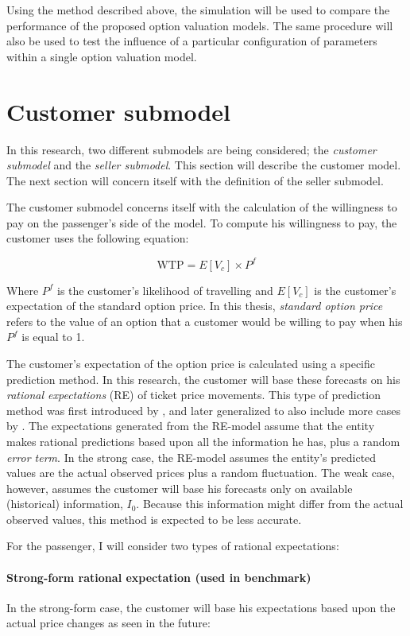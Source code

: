 Using the method described above, the simulation will be used to compare the performance of the proposed option valuation models. The same procedure will also be used to test the influence of a particular configuration of parameters within a single option valuation model.


\section{Customer submodel}
\label{sec:CustomerSubmodel}
In this research, two different submodels are being considered; the \emph{customer submodel} and the \emph{seller submodel}. This section will describe the customer model. The next section will concern itself with the definition of the seller submodel.

The customer submodel concerns itself with the calculation of the willingness to pay on the passenger's side of the model. To compute his willingness to pay, the customer uses the following equation:

$$ \mbox{WTP} = E[V_c] \times P^f $$

Where $P^f$ is the customer's likelihood of travelling and $E[V_c]$ is the customer's expectation of the standard option price. In this thesis, \emph{standard option price} refers to the value of an option that a customer would be willing to pay when his $P^f$ is equal to 1.

The customer's expectation of the option price is calculated using a specific prediction method. In this research, the customer will base these forecasts on his \emph{rational expectations} (RE) of ticket price movements. This type of prediction method was first introduced by , and later generalized to also include more cases by . The expectations generated from the RE-model assume that the entity makes rational predictions based upon all the information he has, plus a random \emph{error term}. In the strong case, the RE-model assumes the entity's predicted values are the actual observed prices plus a random fluctuation. The weak case, however, assumes the customer will base his forecasts only on available (historical) information, $I_0$. Because this information might differ from the actual observed values, this method is expected to be less accurate.

For the passenger, I will consider two types of rational expectations:

\paragraph{Strong-form rational expectation (used in benchmark)}
In the strong-form case, the customer will base his expectations based upon the actual price changes as seen in the future:

